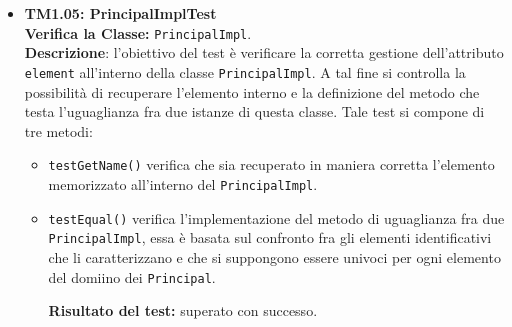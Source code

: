 \begin{itemize}
\item \textbf{TM1.05: PrincipalImplTest}\\
\textbf{Verifica la Classe:} \texttt{PrincipalImpl}.\\
\textbf{Descrizione}: l'obiettivo del test è verificare la corretta gestione dell'attributo \texttt{element} all'interno della classe \texttt{PrincipalImpl}. A tal fine si controlla la possibilità di recuperare l'elemento interno e la definizione del metodo che testa l'uguaglianza fra due istanze di questa classe.
Tale test si compone di tre metodi:
\begin{itemize}
\item \texttt{testGetName()} verifica che sia recuperato in maniera corretta l'elemento memorizzato all'interno del \texttt{PrincipalImpl}.

\item \texttt{testEqual()} verifica l'implementazione del metodo di uguaglianza fra due \texttt{PrincipalImpl}, essa è basata sul confronto fra gli elementi identificativi che li caratterizzano e che si suppongono essere univoci per ogni elemento del domiino dei \texttt{Principal}.

\textbf{Risultato del test:} superato con successo.
\end{itemize}

\end{itemize}
